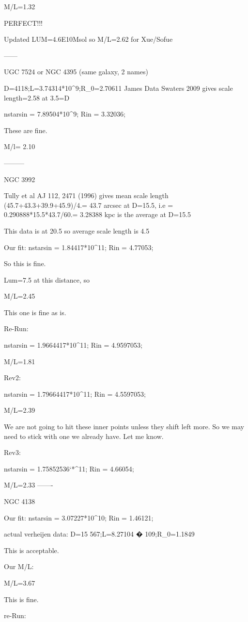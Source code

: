 M/L=1.32

PERFECT!!!

Updated LUM=4.6E10Msol
so M/L=2.62 for Xue/Sofue

------

UGC 7524 or NGC 4395 (same galaxy, 2 names)

D=4118;L=3.74314*10^9;R_0=2.70611  James Data
Swaters 2009 gives scale length=2.58 at 3.5=D


nstarsin = 7.89504*10^9;
Rin = 3.32036;

These are fine.

M/l= 2.10

---------

NGC 3992

Tully et al AJ 112, 2471 (1996) gives mean scale length (45.7+43.3+39.9+45.9)/4.= 43.7
arcsec at D=15.5, i.e = 0.290888*15.5*43.7/60.= 3.28388 kpc is the average at D=15.5

This data is at 20.5 so average scale length is 4.5

Our fit:
nstarsin = 1.84417*10^11;
Rin = 4.77053;

So this is fine.

Lum=7.5 at this distance, so

M/L=2.45

This one is fine as is.

Re-Run:

nstarsin = 1.9664417*10^11;
Rin = 4.9597053;


M/L=1.81

Rev2:

nstarsin = 1.79664417*10^11;
Rin = 4.5597053;

M/L=2.39

We are not going to hit these inner points unless they shift left more.  So we may need to stick with one we already have.  Let me know.

Rev3:

nstarsin = 1.75852536`*^11;
Rin = 4.66054;

M/L=2.33
-------

NGC 4138

Our fit:
nstarsin = 3.07227*10^10;
Rin = 1.46121;

actual verheijen data:
D=15 567;L=8.27104 � 109;R_0=1.1849

This is acceptable.

Our M/L:

M/L=3.67

This is fine.


re-Run:

